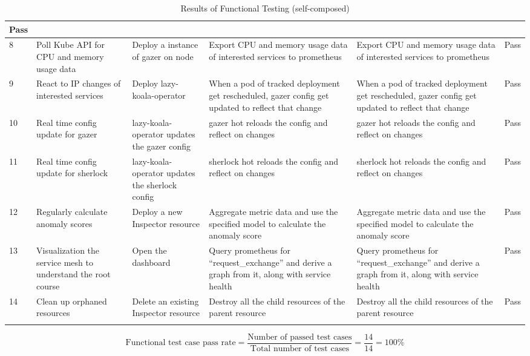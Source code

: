\begin{longtable}{|p{3mm}|p{30mm}|p{27mm}|p{33mm}|p{33mm}|p{10mm}|}
      Pass \\ \hline
    8 &
      Poll Kube API for CPU and memory usage data &
      Deploy a instance of \ac{gazer} on node &
      Export CPU and memory usage data of interested services to prometheus &
      Export CPU and memory usage data of interested services to prometheus &
      Pass \\ \hline
    9 &
      React to IP changes of interested services &
      Deploy \ac{lazy-koala-operator} &
      When a pod of tracked deployment get rescheduled, gazer config get updated to reflect that change &
      When a pod of tracked deployment get rescheduled, gazer config get updated to reflect that change &
      Pass \\ \hline
    10 &
      Real time config update for \ac{gazer} &
      \ac{lazy-koala-operator} updates the \ac{gazer} config &
      \ac{gazer} hot reloads the config and reflect on changes &
      \ac{gazer} hot reloads the config and reflect on changes &
      Pass \\ \hline
    11 &
      Real time config update for \ac{sherlock} &
      \ac{lazy-koala-operator} updates the \ac{sherlock} config &
      \ac{sherlock} hot reloads the config and reflect on changes &
      \ac{sherlock} hot reloads the config and reflect on changes &
      Pass \\ \hline
    12 &
      Regularly calculate anomaly scores &
      Deploy a new Inspector resource &
      Aggregate metric data and use the specified model to calculate the anomaly score &
      Aggregate metric data and use the specified model to calculate the anomaly score &
      Pass \\ \hline
    13 &
      Visualization the service mesh to understand the root course &
      Open the dashboard &
      Query prometheus for “request\_exchange” and derive a graph from it, along with service health &
      Query prometheus for “request\_exchange” and derive a graph from it, along with service health &
      Pass \\ \hline
    14 &
      Clean up orphaned resources &
      Delete an existing Inspector resource &
      Destroy all the child resources of the parent resource &
      Destroy all the child resources of the parent resource &
      Pass \\ \hline

      \caption{Results of Functional Testing (self-composed)}
\end{longtable}

\begingroup
\setlength{\abovedisplayskip}{-0.5cm}
\[
\text{Functional test case pass rate} = \frac{\text{Number of passed test cases}}{\text{Total number of test cases}} = \frac{14}{14} = 100\%
\]
\endgroup